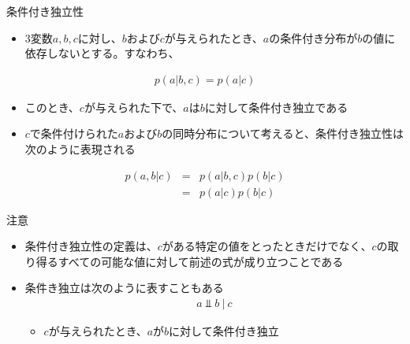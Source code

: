 \begin{frame}{条件付き独立性}
 \begin{itemize}
  \item 3変数$a,b,c$に対し、$b$および$c$が与えられたとき、$a$の条件付き分布が$b$の値に依存しないとする。すなわち、
 \end{itemize}
 \begin{eqnarray*}
  p(a|b,c) = p(a|c)
 \end{eqnarray*}
 \begin{itemize}
  \item このとき、$c$が与えられた下で、$a$は$b$に対して条件付き独立である

  \item $c$で条件付けられた$a$および$b$の同時分布について考えると、条件付き独立性は次のように表現される
 \end{itemize}
 \begin{eqnarray*}
  p(a,b|c) &=& p(a|b,c)p(b|c)\\
  &= & p(a|c)p(b|c)
 \end{eqnarray*}
\end{frame}

\begin{frame}{注意}
 \begin{itemize}
  \item 条件付き独立性の定義は、$c$がある特定の値をとったときだけでなく、$c$の取り得るすべての可能な値に対して前述の式が成り立つことである
  \item 条件き独立は次のように表すこともある
        \begin{eqnarray*}
         a \Perp b \ | \ c
        \end{eqnarray*}
        \begin{itemize}
         \item $c$が与えられたとき、$a$が$b$に対して条件付き独立
        \end{itemize}
 \end{itemize}
\end{frame}
